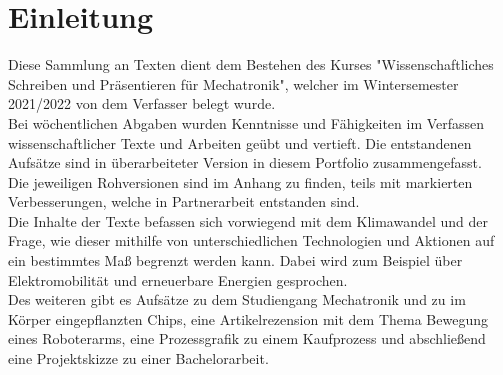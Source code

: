 \chapter{Einleitung}
Diese Sammlung an Texten dient dem Bestehen des Kurses "Wissenschaftliches Schreiben und Präsentieren für Mechatronik", welcher im Wintersemester 2021/2022 von dem Verfasser belegt wurde.\\
Bei wöchentlichen Abgaben wurden Kenntnisse und Fähigkeiten im Verfassen wissenschaftlicher Texte und Arbeiten geübt und vertieft. Die entstandenen Aufsätze sind in überarbeiteter Version in diesem Portfolio zusammengefasst. \\
Die jeweiligen Rohversionen sind im Anhang zu finden, teils mit markierten Verbesserungen, welche in Partnerarbeit entstanden sind.\\
Die Inhalte der Texte befassen sich vorwiegend mit dem Klimawandel und der Frage, wie dieser mithilfe von unterschiedlichen Technologien und Aktionen auf ein bestimmtes Maß begrenzt werden kann. Dabei wird zum Beispiel über Elektromobilität und erneuerbare Energien gesprochen.\\
Des weiteren gibt es Aufsätze zu dem Studiengang Mechatronik und zu im Körper eingepflanzten Chips, eine Artikelrezension mit dem Thema Bewegung eines Roboterarms, eine Prozessgrafik zu einem Kaufprozess und abschließend eine Projektskizze zu einer Bachelorarbeit.
